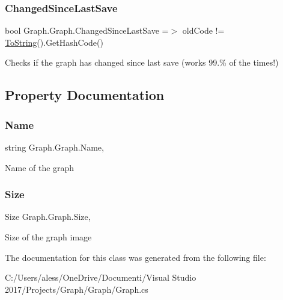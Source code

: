 \subsubsection{\texorpdfstring{Changed\+Since\+Last\+Save}{ChangedSinceLastSave}}
{\footnotesize\ttfamily bool Graph.\+Graph.\+Changed\+Since\+Last\+Save =$>$ old\+Code != \hyperlink{class_graph_1_1_graph_a156e417443003071243e2a22ba0a1533}{To\+String}().Get\+Hash\+Code()}



Checks if the graph has changed since last save (works 99.\% of the times!) 



\subsection{Property Documentation}
\mbox{\label{class_graph_1_1_graph_a2635cdb256ccefb545cf402bd52a3f80}} 
\subsubsection{\texorpdfstring{Name}{Name}}
{\footnotesize\ttfamily string Graph.\+Graph.\+Name\hspace{0.3cm}{\ttfamily [get]}, {\ttfamily [set]}}



Name of the graph 

\mbox{\label{class_graph_1_1_graph_ace6128caf64c731423b0ccd106f3ada6}} 
\subsubsection{\texorpdfstring{Size}{Size}}
{\footnotesize\ttfamily Size Graph.\+Graph.\+Size\hspace{0.3cm}{\ttfamily [static]}, {\ttfamily [get]}}



Size of the graph image 



The documentation for this class was generated from the following file\+:\begin{DoxyCompactItemize}
\item 
C\+:/\+Users/aless/\+One\+Drive/\+Documenti/\+Visual Studio 2017/\+Projects/\+Graph/\+Graph/Graph.\+cs\end{DoxyCompactItemize}
